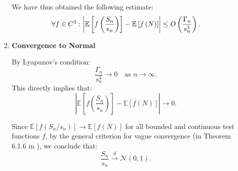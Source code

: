 \begin{itemize}
\begin{enumerate}
We have thus obtained the following estimate:
\[
\forall f \in C^3: \left| \space  \mathbb{E}\left[f\left(\frac{S_n}{s_n}\right)\right] - \mathbb{E}\left[f\left(N\right)\right] \right| \leq O\left(\frac{\Gamma_n}{s_n^3}\right).
\]

\item \textbf{Convergence to Normal}

By Lyapunov's condition:
\[
\frac{\Gamma_n}{s_n^3} \to 0 \quad \text{as } n \to \infty.
\]
This directly implies that:
\[
\left| \mathbb{E}\left[f\left(\frac{S_n}{s_n}\right)\right] - \mathbb{E}\left[f(N)\right] \right| \to 0.
\]

Since \( \mathbb{E}[f(S_n / s_n)] \to \mathbb{E}[f(N)] \) for all bounded and continuous test functions \( f \), by the general criterion for vague convergence (in Theorem 6.1.6 in \cite{chung2000course}), we conclude that:
\[
\frac{S_n}{s_n} \xrightarrow{d} \mathcal{N}(0, 1).
\]

    \end{enumerate}
\end{itemize}
